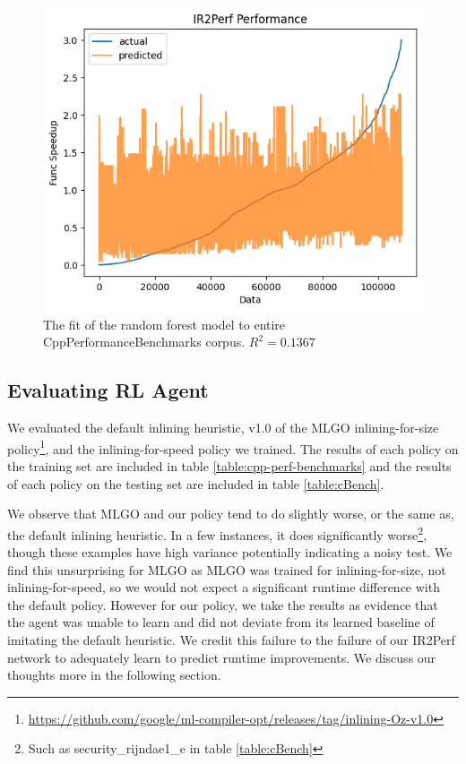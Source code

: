 \documentclass[nohyperref]{article}
\theoremstyle{plain}
\theoremstyle{definition}
\theoremstyle{remark}
\begin{document}
\begin{figure}[h!]
    \centerline{\includegraphics[width=\columnwidth]{ir2perf-fit}}
    \caption{The fit of the random forest model to entire CppPerformanceBenchmarks corpus. $R^2 = 0.1367$}
    \label{fig:ir2perf-fit}
\end{figure}

\subsection{Evaluating RL Agent}
We evaluated the default inlining heuristic, v1.0 of the MLGO inlining-for-size policy\footnote{\href{https://github.com/google/ml-compiler-opt/releases/tag/inlining-Oz-v1.0}{https://github.com/google/ml-compiler-opt/releases/tag/inlining-Oz-v1.0}}, and the inlining-for-speed policy we trained. The results of each policy on the training set are included in table \ref{table:cpp-perf-benchmarks} and the results of each policy on the testing set are included in table \ref{table:cBench}.

We observe that MLGO and our policy tend to do slightly worse, or the same as, the default inlining heuristic. In a few instances, it does significantly worse\footnote{Such as security\_rijndae1\_e in table \ref{table:cBench}}, though these examples have high variance potentially indicating a noisy test. We find this unsurprising for MLGO as MLGO was trained for inlining-for-size, not inlining-for-speed, so we would not expect a significant runtime difference with the default policy. However for our policy, we take the results as evidence that the agent was unable to learn and did not deviate from its learned baseline of imitating the default heuristic. We credit this failure to the failure of our IR2Perf network to adequately learn to predict runtime improvements. We discuss our thoughts more in the following section.
\end{document}
